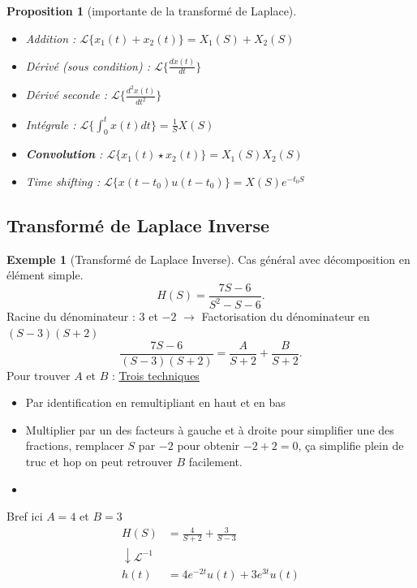 \documentclass{article}
\theoremstyle{plain}%
\newtheorem{prop}[thm]{Proposition}
\theoremstyle{definition}
\newtheorem{exmp}{Exemple}[section]
\theoremstyle{remark}
\begin{document}
\begin{prop}[importante de la transformé de Laplace]
    \begin{itemize}
        \item Addition : $ \mathcal{L}\{x_1(t) + x_2(t)\} = X_1(S) + X_2(S)$ 
        \item Dérivé (sous condition) : $ \mathcal{L}\{\frac{dx(t)}{dt}\} $ 
        \item Dérivé seconde : $ \mathcal{L}\{\frac{d^2x(t)}{dt^2}\} $ 
        \item Intégrale : $ \mathcal{L}\{\int_{0}^{t}x(t)dt\} = \frac{1}{S}X(S) $ 
        \item \textbf{Convolution} : $ \mathcal{L}\{x_1(t) \star x_2(t)\} = X_1(S) X_2(S)$ 
        \item Time shifting : $ \mathcal{L}\{x(t-t_0) u(t - t_0)\} = X(S)e^{-t_0 S}$ 
    \end{itemize}
\end{prop}

\subsection{Transformé de Laplace Inverse}

\begin{exmp}[Transformé de Laplace Inverse]
    Cas général avec décomposition en élément simple.
    \[
        H(S) = \frac{7S - 6}{S^2 - S - 6}
    .\]
    Racine du dénominateur : $ 3 $ et $ -2 $ $\rightarrow$ Factorisation du dénominateur en $ (S-3)(S+2) $ 
    \[
        \frac{7S-6}{(S-3)(S+2)} = \frac{A}{S+2} + \frac{B}{S+2}
    .\]
    Pour trouver $ A $ et $ B $ : \href{https://www.methodemaths.fr/decomposition_elements_simples/#principe}{Trois techniques} \begin{itemize}
        \item Par identification en remultipliant en haut et en bas 
        \item Multiplier par un des facteurs à gauche et à droite pour simplifier une des fractions, remplacer $ S $ par $ -2 $ pour obtenir $ -2+2 = 0 $, ça simplifie plein de truc et hop on peut retrouver $ B $ facilement.
        \item 
    \end{itemize}
    Bref ici $ A = 4 $ et $ B=3 $ \begin{align*}
        H(S) &= \frac{4}{S+2}  + \frac{3}{S - 3} \\
        \downarrow \mathcal{L}^{-1}& \\
            h(t) &= 4 e^{-2t} u(t) + 3 e^{3t} u(t)
    \end{align*}
\end{exmp}
\end{document}
